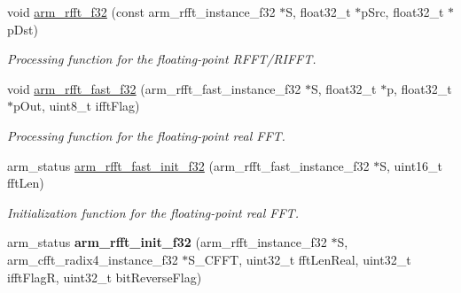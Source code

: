 \begin{DoxyCompactItemize}
\item 
void \hyperlink{group__RealFFT_ga3df1766d230532bc068fc4ed69d0fcdc}{arm\+\_\+rfft\+\_\+f32} (const arm\+\_\+rfft\+\_\+instance\+\_\+f32 $\ast$S, float32\+\_\+t $\ast$p\+Src, float32\+\_\+t $\ast$p\+Dst)
\begin{DoxyCompactList}\small\item\em Processing function for the floating-\/point R\+F\+F\+T/\+R\+I\+F\+FT. \end{DoxyCompactList}\item 
void \hyperlink{group__RealFFT_ga180d8b764d59cbb85d37a2d5f7cd9799}{arm\+\_\+rfft\+\_\+fast\+\_\+f32} (arm\+\_\+rfft\+\_\+fast\+\_\+instance\+\_\+f32 $\ast$S, float32\+\_\+t $\ast$p, float32\+\_\+t $\ast$p\+Out, uint8\+\_\+t ifft\+Flag)
\begin{DoxyCompactList}\small\item\em Processing function for the floating-\/point real F\+FT. \end{DoxyCompactList}\item 
arm\+\_\+status \hyperlink{group__RealFFT_gac5fceb172551e7c11eb4d0e17ef15aa3}{arm\+\_\+rfft\+\_\+fast\+\_\+init\+\_\+f32} (arm\+\_\+rfft\+\_\+fast\+\_\+instance\+\_\+f32 $\ast$S, uint16\+\_\+t fft\+Len)
\begin{DoxyCompactList}\small\item\em Initialization function for the floating-\/point real F\+FT. \end{DoxyCompactList}\item 
arm\+\_\+status {\bfseries arm\+\_\+rfft\+\_\+init\+\_\+f32} (arm\+\_\+rfft\+\_\+instance\+\_\+f32 $\ast$S, arm\+\_\+cfft\+\_\+radix4\+\_\+instance\+\_\+f32 $\ast$S\+\_\+\+C\+F\+FT, uint32\+\_\+t fft\+Len\+Real, uint32\+\_\+t ifft\+FlagR, uint32\+\_\+t bit\+Reverse\+Flag)\hypertarget{group__RealFFT_ga10717ee326bf50832ef1c25b85a23068}{}\label{group__RealFFT_ga10717ee326bf50832ef1c25b85a23068}


\end{DoxyCompactItemize}
